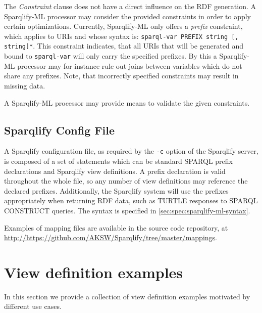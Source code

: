 \documentclass[a4paper,twoside,bibtotoc,abstracton,12pt,BCOR=15mm]{scrreprt}
\begin{document}
The \emph{Constraint} clause does not have a direct influence on the RDF generation. 
A Sparqlify-ML processor may consider the provided constraints in order to apply certain optimizations.
Currently, Sparqlify-ML only offers a \emph{prefix} constraint, which applies to URIs and whose 
syntax is: \texttt{sparql-var PREFIX string [, string]*}.
This constraint indicates, that all URIs that will be generated and bound to \texttt{sparql-var} will only carry the specified prefixes.
By this a Sparqlify-ML processor may for instance rule out joins between variables which do not share any prefixes.
Note, that incorrectly specified constraints may result in missing data.
  
A Sparqlify-ML processor may provide means to validate the given constraints.


\subsection{Sparqlify Config File}
\label{sect:sparqlify-config-file}
A Sparqlify configuration file, as required by the \texttt{-c} option of the Sparqlify server, is composed of a set of statements
which can be standard SPARQL prefix declarations and Sparqlify view definitions.
A prefix declaration is valid throughout the whole file, so any number of view definitions may reference the declared prefixes.
Additionally, the Sparqlify system will use the prefixes appropriately when returning RDF data, such as TURTLE responses to SPARQL CONSTRUCT queries.    
The syntax is specified in \autoref{sec:spec:sparqlify-ml-syntax}.

Examples of mapping files are available in the source code repository, at \url{http://https://github.com/AKSW/Sparqlify/tree/master/mappings}.

\newpage
\section{View definition examples}
In this section we provide a collection of view definition examples motivated by different use cases.
\end{document}
